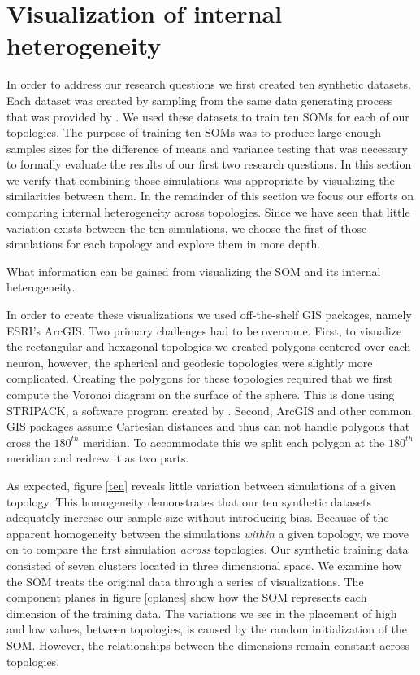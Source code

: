 \section{Visualization of internal heterogeneity}
\label{rdq3}
In order to address our research questions we first created ten synthetic
datasets.  Each dataset was created by sampling from the same data generating process
that was provided by \cite{wu2006}.  We used these datasets to train ten
SOMs for each of our topologies.  The purpose of training ten SOMs was to
produce large enough samples sizes for the difference of means and variance
testing that was necessary to formally evaluate the results of our first two
research questions.  In this section we verify that combining those
simulations was appropriate by visualizing the similarities between them.
In the remainder of this section we focus our efforts on comparing internal
heterogeneity across
topologies.  Since we have seen that little variation exists between the ten
simulations, we choose the first of those simulations for each topology and
explore them in more depth.


What information can be gained from visualizing the SOM and its
internal heterogeneity. 

In order to create these visualizations we used off-the-shelf GIS packages,
namely ESRI's ArcGIS.  Two primary challenges had to be overcome. First, to
visualize the rectangular and hexagonal topologies we created polygons
centered over each neuron, however, the spherical and geodesic topologies were
slightly more complicated.  Creating the polygons for these topologies
required that we first compute the Voronoi diagram on the surface of the
sphere.  This is done using STRIPACK, a software program created by
\cite{Ranka97}.  Second, ArcGIS and other common GIS packages assume Cartesian
distances and thus can not handle polygons that cross the $180^{th}$ meridian.
To accommodate this we split each polygon at the $180^{th}$ meridian and
redrew it as two parts.

As expected, figure \ref{ten} reveals little variation 
between simulations of a given topology.  This homogeneity demonstrates that
our ten synthetic datasets adequately increase our sample size without introducing bias.  
Because of the apparent homogeneity between the simulations \emph{within} a
given topology, we move on to compare the first simulation \emph{across} topologies.  
Our synthetic training data consisted of seven clusters located in three
dimensional space. We examine how the SOM treats the original data through a
series of visualizations.  The component planes in figure \ref{cplanes} show
how the SOM represents each dimension of the training data.  The variations we
see in the placement of high and low values, between topologies, is caused by
the random initialization of the SOM.  However, the relationships between the
dimensions remain constant across topologies. 

